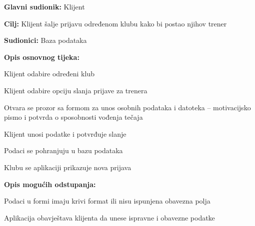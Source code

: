 					
					\noindent {}
					\begin{packed_item}
	
						\item \textbf{Glavni sudionik: }Klijent
						\item  \textbf{Cilj:} Klijent šalje prijavu određenom klubu kako bi postao njihov trener
						\item  \textbf{Sudionici:} Baza podataka
						\item  \textbf{Opis osnovnog tijeka:						
						}
						
						\item[] \begin{packed_enum}
	
							\item Klijent odabire određeni klub
							\item Klijent odabire opciju slanja prijave za trenera
							\item Otvara se prozor sa formom za unos osobnih podataka i datoteka – motivacijsko pismo i potvrda o sposobnosti vođenja tečaja
							\item Klijent unosi podatke i potvrđuje slanje
							\item Podaci se pohranjuju u bazu podataka
							\item Klubu se aplikaciji prikazuje nova prijava
						\end{packed_enum}
						
						\item  \textbf{Opis mogućih odstupanja:}
						
						\item[] \begin{packed_item}
	
							\item[4.a] Podaci u formi imaju krivi format ili nisu ispunjena obavezna polja
							\item[] \begin{packed_enum}
								
								\item Aplikacija obavještava klijenta da unese ispravne i obavezne podatke
																
							\end{packed_enum}
														
						\end{packed_item}
					\end{packed_item}
					
